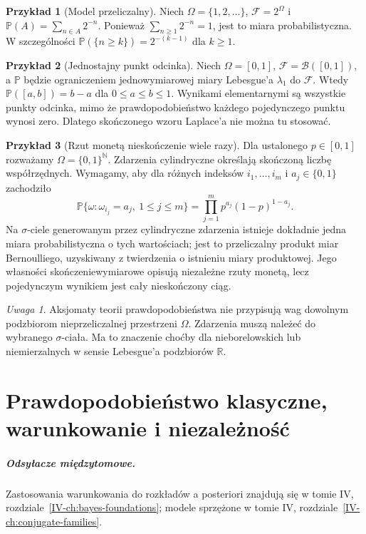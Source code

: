 \documentclass[11pt,a4paper,oneside]{report}
\numberwithin{equation}{chapter}
\theoremstyle{plain}
\theoremstyle{definition}
\newtheorem{przyklad}{Przykład}[chapter]
\theoremstyle{remark}
\newtheorem{uwaga}{Uwaga}[chapter]
\newcommand{\R}{\mathbb{R}}
\newcommand{\N}{\mathbb{N}}
\newcommand{\Prob}{\mathbb{P}}
\begin{document}
\begin{przyklad}[Model przeliczalny]
Niech $\Omega=\{1,2,\ldots\}$, $\mathcal F=2^\Omega$ i
$\Prob(A)=\sum_{n\in A}2^{-n}$. Ponieważ $\sum_{n\geq1}2^{-n}=1$,
jest to miara probabilistyczna. W szczególności
$\Prob(\{n\geq k\})=2^{-(k-1)}$ dla $k\geq1$.
\end{przyklad}

\begin{przyklad}[Jednostajny punkt odcinka]
Niech $\Omega=[0,1]$, $\mathcal F=\mathcal B([0,1])$,
a $\Prob$ będzie ograniczeniem jednowymiarowej miary Lebesgue'a
$\lambda_1$ do $\mathcal F$. Wtedy $\Prob([a,b])=b-a$
dla $0\leq a\leq b\leq1$. Wynikami elementarnymi są wszystkie
punkty odcinka, mimo że prawdopodobieństwo każdego pojedynczego
punktu wynosi zero. Dlatego skończonego wzoru Laplace'a nie można
tu stosować.
\end{przyklad}

\begin{przyklad}[Rzut monetą nieskończenie wiele razy]
Dla ustalonego $p\in[0,1]$ rozważamy $\Omega=\{0,1\}^{\N}$.
Zdarzenia cylindryczne określają skończoną liczbę współrzędnych.
Wymagamy, aby dla różnych indeksów $i_1,\ldots,i_m$ i
$a_j\in\{0,1\}$ zachodziło
\[
\Prob\{\omega:\omega_{i_j}=a_j,\ 1\leq j\leq m\}
=\prod_{j=1}^m p^{a_j}(1-p)^{1-a_j}.
\]
Na $\sigma$-ciele generowanym przez cylindryczne zdarzenia
istnieje dokładnie jedna miara probabilistyczna o tych wartościach;
jest to przeliczalny produkt miar Bernoulliego, uzyskiwany z twierdzenia
o istnieniu miary produktowej. Jego własności skończeniewymiarowe
opisują niezależne rzuty monetą, lecz pojedynczym wynikiem jest cały
nieskończony ciąg.
\end{przyklad}

\begin{uwaga}
Aksjomaty teorii prawdopodobieństwa nie przypisują wag dowolnym
podzbiorom nieprzeliczalnej przestrzeni $\Omega$. Zdarzenia muszą
należeć do wybranego $\sigma$-ciała. Ma to znaczenie choćby dla
nieborelowskich lub niemierzalnych w sensie Lebesgue'a podzbiorów $\R$.
\end{uwaga}

\chapter{Prawdopodobieństwo klasyczne, warunkowanie i niezależność}
\label{ch:conditioning}
\paragraph{Odsyłacze międzytomowe.} Zastosowania warunkowania do rozkładów a posteriori znajdują się w tomie IV, rozdziale~\ref{IV-ch:bayes-foundations}; modele sprzężone w tomie IV, rozdziale~\ref{IV-ch:conjugate-families}.
\end{document}
